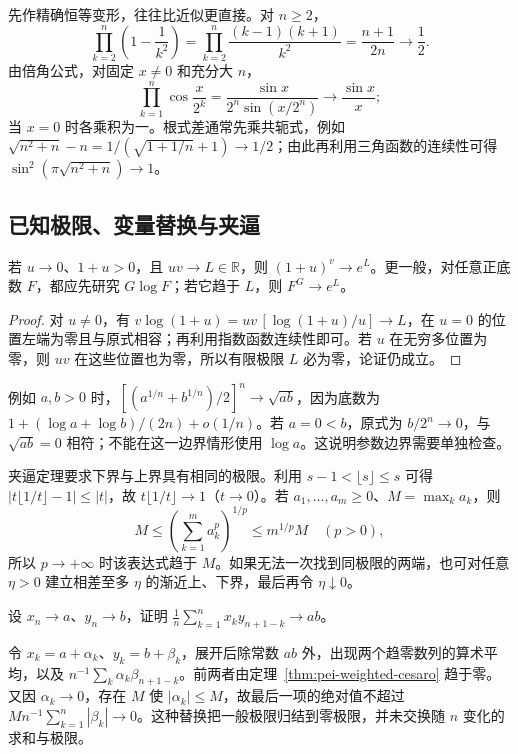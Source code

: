 先作精确恒等变形，往往比近似更直接。对 $n\ge2$，
\[
    \prod_{k=2}^n\left(1-\frac1{k^2}\right)
    =\prod_{k=2}^n\frac{(k-1)(k+1)}{k^2}
    =\frac{n+1}{2n}\longrightarrow\frac12.
\]
由倍角公式，对固定 $x\ne0$ 和充分大 $n$，
\[
    \prod_{k=1}^n\cos\frac{x}{2^k}
    =\frac{\sin x}{2^n\sin(x/2^n)}\longrightarrow\frac{\sin x}{x};
\]
当 $x=0$ 时各乘积为一。根式差通常先乘共轭式，例如 $\sqrt{n^2+n}-n=1/(\sqrt{1+1/n}+1)\to1/2$；由此再利用三角函数的连续性可得 $\sin^2(\pi\sqrt{n^2+n})\to1$。

\subsection{已知极限、变量替换与夹逼}

\begin{proposition}[幂式极限]
\label{prop:pei-power-limit}
若 $u\to0$、$1+u>0$，且 $uv\to L\in\mathbb{R}$，则 $(1+u)^v\to e^L$。更一般，对任意正底数 $F$，都应先研究 $G\log F$；若它趋于 $L$，则 $F^G\to e^L$。
\end{proposition}
\begin{proof}
对 $u\ne0$，有 $v\log(1+u)=uv\,[\log(1+u)/u]\to L$，在 $u=0$ 的位置左端为零且与原式相容；再利用指数函数连续性即可。若 $u$ 在无穷多位置为零，则 $uv$ 在这些位置也为零，所以有限极限 $L$ 必为零，论证仍成立。
\end{proof}

例如 $a,b>0$ 时，$\left[(a^{1/n}+b^{1/n})/2\right]^n\to\sqrt{ab}$，因为底数为 $1+(\log a+\log b)/(2n)+o(1/n)$。若 $a=0<b$，原式为 $b/2^n\to0$，与 $\sqrt{ab}=0$ 相符；不能在这一边界情形使用 $\log a$。这说明参数边界需要单独检查。

夹逼定理要求下界与上界具有相同的极限。利用 $s-1<\lfloor s\rfloor\le s$ 可得 $|t\lfloor1/t\rfloor-1|\le|t|$，故 $t\lfloor1/t\rfloor\to1$（$t\to0$）。若 $a_1,\ldots,a_m\ge0$、$M=\max_ka_k$，则
\[
    M\le\left(\sum_{k=1}^ma_k^p\right)^{1/p}\le m^{1/p}M
    \quad(p>0),
\]
所以 $p\to+\infty$ 时该表达式趋于 $M$。如果无法一次找到同极限的两端，也可对任意 $\eta>0$ 建立相差至多 $\eta$ 的渐近上、下界，最后再令 $\eta\downarrow0$。

\begin{example}
\label{ex:pei-convolution-means}
设 $x_n\to a$、$y_n\to b$，证明 $\displaystyle\frac1n\sum_{k=1}^nx_ky_{n+1-k}\to ab$。
\end{example}
\begin{solve}
令 $x_k=a+\alpha_k$、$y_k=b+\beta_k$，展开后除常数 $ab$ 外，出现两个趋零数列的算术平均，以及 $n^{-1}\sum_k\alpha_k\beta_{n+1-k}$。前两者由定理~\ref{thm:pei-weighted-cesaro} 趋于零。又因 $\alpha_k\to0$，存在 $M$ 使 $|\alpha_k|\le M$，故最后一项的绝对值不超过 $Mn^{-1}\sum_{k=1}^n|\beta_k|\to0$。这种替换把一般极限归结到零极限，并未交换随 $n$ 变化的求和与极限。
\end{solve}

